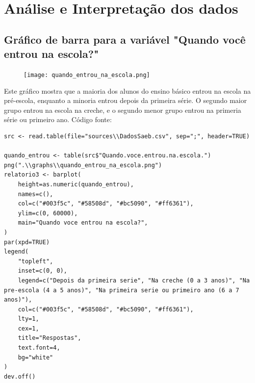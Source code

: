 \documentclass[17pt]{extarticle}
\begin{document}
\section{Análise e Interpretação dos dados}
\subsection{Gráfico de barra para a variável "Quando você entrou na escola?"}
\begin{figure}[H]
    \texttt{[image: quando\_entrou\_na\_escola.png]}
    \centering
\end{figure}
Este gráfico mostra que a maioria dos alunos do ensino básico entrou na escola na pré-escola, enquanto a minoria entrou depois da primeira série. O segundo maior grupo entrou na escola na creche, e o segundo menor grupo entrou na primeria série ou primeiro ano. \newline
Código fonte: \newline
\begin{lstlisting}
src <- read.table(file="sources\\DadosSaeb.csv", sep=";", header=TRUE)

quando_entrou <- table(src$"Quando.voce.entrou.na.escola.")
png(".\\graphs\\quando_entrou_na_escola.png")
relatorio3 <- barplot(
    height=as.numeric(quando_entrou),
    names=c(),
    col=c("#003f5c", "#58508d", "#bc5090", "#ff6361"),
    ylim=c(0, 60000),
    main="Quando voce entrou na escola?",
)
par(xpd=TRUE)
legend(
    "topleft",
    inset=c(0, 0),
    legend=c("Depois da primeira serie", "Na creche (0 a 3 anos)", "Na pre-escola (4 a 5 anos)", "Na primeira serie ou primeiro ano (6 a 7 anos)"),
    col=c("#003f5c", "#58508d", "#bc5090", "#ff6361"),
    lty=1,
    cex=1,
    title="Respostas",
    text.font=4,
    bg="white"
)
dev.off()
\end{lstlisting}
\end{document}
